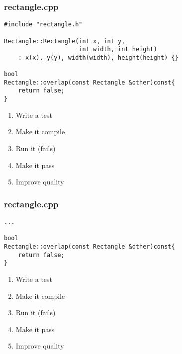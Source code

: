 \begin{frame}[fragile]
\frametitle{rectangle.cpp}
\begin{minipage}[t]{0.48\linewidth}
\begin{lstlisting}
#include "rectangle.h"

Rectangle::Rectangle(int x, int y, 
                     int width, int height)
    : x(x), y(y), width(width), height(height) {}

bool 
Rectangle::overlap(const Rectangle &other)const{
    return false;
}
\end{lstlisting}
\end{minipage}\hfill
\begin{minipage}[t]{0.28\linewidth}
  \small
  \begin{enumerate} 
    \item \textcolor{deadcolor}{Write a test}
    \item \textcolor{activecolor}{Make it compile}
    \item \textcolor{deadcolor}{Run it (fails)}
    \item \textcolor{deadcolor}{Make it pass}
    \item \textcolor{deadcolor}{Improve quality}
  \end{enumerate} 
\end{minipage}
\end{frame}

\begin{frame}[fragile]
\frametitle{rectangle.cpp}
\begin{minipage}[t]{0.48\linewidth}
\begin{lstlisting}
...

bool 
Rectangle::overlap(const Rectangle &other)const{
    return false;
}
\end{lstlisting}
\end{minipage}\hfill
\begin{minipage}[t]{0.28\linewidth}
  \small
  \begin{enumerate} 
    \item \textcolor{deadcolor}{Write a test}
    \item \textcolor{activecolor}{Make it compile}
    \item \textcolor{deadcolor}{Run it (fails)}
    \item \textcolor{deadcolor}{Make it pass}
    \item \textcolor{deadcolor}{Improve quality}
  \end{enumerate} 
\end{minipage}
\end{frame}



